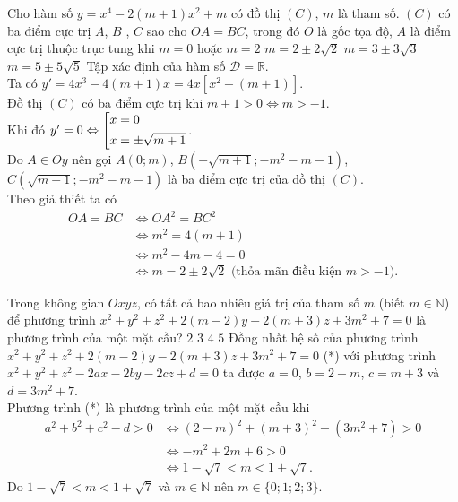 \begin{ex}%
 Cho hàm số $y = x^4 - 2(m+1)x^2 + m$ có đồ thị $(C)$, $m$ là tham số. $(C)$ có ba điểm cực trị $A$, $B$ , $C$ sao cho $OA = BC$, trong đó $O$ là gốc tọa độ, $A$ là điểm cực trị thuộc trục tung khi
 \choice
  {$m = 0$ hoặc $m = 2$}
  {\True $m = 2 \pm 2\sqrt{2}$}
  {$m = 3 \pm 3\sqrt{3}$}
  {$m = 5 \pm 5\sqrt{5}$}
 \loigiai
  {
  Tập xác định của hàm số $\mathscr{D} = \mathbb{R}$.\\
  Ta có $y' = 4x^3 - 4(m+1)x = 4x \left[ x^2 - (m+1) \right]$.\\
  Đồ thị $(C)$ có ba điểm cực trị khi $m + 1 > 0 \Leftrightarrow m > -1$.\\
  Khi đó $y' = 0 \Leftrightarrow \left[\begin{aligned}& x = 0 \\& x = \pm \sqrt{m + 1}\end{aligned}\right.$.\\
  Do $A \in Oy$ nên gọi $A(0;m)$, $B \left( -\sqrt{m+1}; -m^2-m-1 \right)$, $C \left( \sqrt{m+1}; -m^2-m-1 \right)$ là ba điểm cực trị của đồ thị $(C)$.\\
  Theo giả thiết ta có
  \begin{align*}
   OA = BC & \Leftrightarrow OA^2 = BC^2 \\
   & \Leftrightarrow m^2 = 4(m + 1) \\
   & \Leftrightarrow m^2 - 4m - 4 = 0 \\
   & \Leftrightarrow m = 2 \pm 2\sqrt{2} \text{ (thỏa mãn điều kiện } m > -1).
  \end{align*}
  }
\end{ex}

\begin{ex}%
 Trong không gian $Oxyz$, có tất cả bao nhiêu giá trị của tham số $m$ (biết $m \in \mathbb{N}$) để phương trình $x^2 + y^2 + z^2 + 2(m-2)y - 2(m+3)z + 3m^2 + 7 = 0$ là phương trình của một mặt cầu?
 \choice
  {$2$}
  {$3$}
  {\True $4$}
  {$5$}
 \loigiai
  {
  Đồng nhất hệ số của phương trình $x^2 + y^2 + z^2 + 2(m-2)y - 2(m+3)z + 3m^2 + 7 = 0$ (*) với phương trình $x^2 + y^2 + z^2 - 2ax - 2by - 2cz + d = 0$ ta được $a = 0$, $b = 2 - m$, $c = m + 3$ và $d = 3m^2 + 7$.\\
  Phương trình (*) là phương trình của một mặt cầu khi
  \begin{align*}
   a^2 + b^2 + c^2 - d > 0 & \Leftrightarrow (2-m)^2 + (m+3)^2 - (3m^2 + 7) > 0 \\
   & \Leftrightarrow -m^2 + 2m + 6 > 0 \\
   & \Leftrightarrow 1 - \sqrt{7} < m < 1 + \sqrt{7}.
  \end{align*}
  Do $1 - \sqrt{7} < m < 1 + \sqrt{7}$ và $m \in \mathbb{N}$ nên $m \in \{ 0; 1; 2; 3 \}$.
  }
\end{ex}

